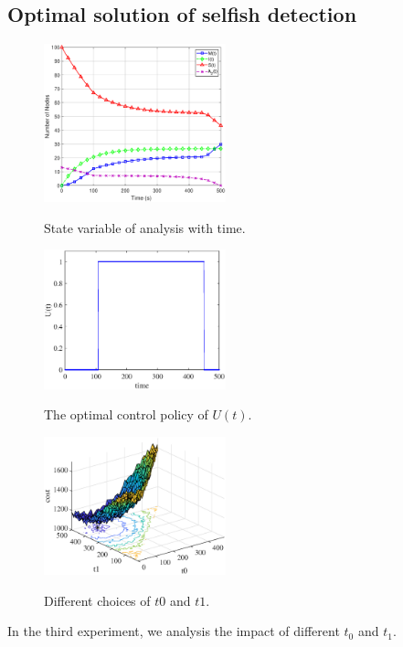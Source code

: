 \subsection{Optimal solution of selfish detection}
\begin{figure}
  \centering
  {\includegraphics[width=0.47\textwidth]{fig/state.eps}}
     \caption{State variable of analysis with time.}
     \label{fig:pe_opt_state_time}
\end{figure}
\begin{figure}
  \centering
  {\includegraphics[width=0.47\textwidth]{fig/Ut.eps}}
     \caption{The optimal control policy of $U(t)$.}
     \label{fig:pe_opt_control_Ut}
\end{figure}
\begin{figure}
  \centering
  {\includegraphics[width=0.47\textwidth]{fig/cost_all_t0t1.eps}}
     \caption{Different choices of $t0$ and $t1$.}
     \label{fig:pe_diff_choices}
\end{figure}

In the third experiment,
we analysis the impact of different $t_0$ and $t_1$.